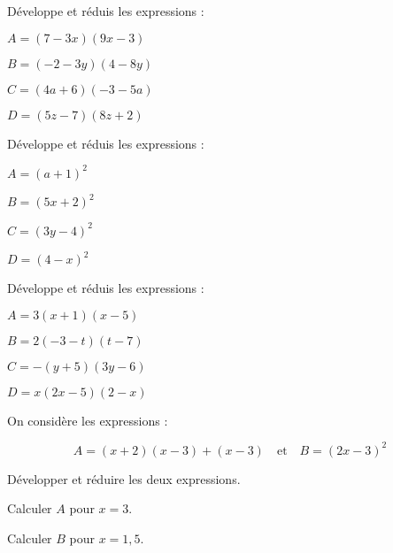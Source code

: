 \begin{exercice}[]
Développe et réduis les expressions :
\begin{colenumerate}{2}
\item $A = (7 -3x)(9x -3)$
\item $B = (-2 -3y)(4 -8y)$
\item $C = (4a + 6)(-3 -5a)$
\item $D = (5z -7)(8z + 2)$
\end{colenumerate}
\end{exercice}

\begin{exercice}[]
Développe et réduis les expressions :
\begin{colenumerate}{2}
\item $A = (a + 1)^2$
\item $B = (5x + 2)^2$
\item $C = (3y -4)^2$
\item $D = (4 -x)^2$
\end{colenumerate}
\end{exercice}

\begin{exercice}[]
Développe et réduis les expressions :
\begin{colenumerate}{2}
\item $A = 3(x + 1)(x -5)$
\item $B = 2(-3 -t)(t -7)$
\item $C = -(y + 5)(3y -6)$
\item $D = x(2x -5)(2 -x)$
\end{colenumerate}
\end{exercice}

\begin{exercice}[]
On considère les expressions :

\[A = (x + 2)(x -3) + (x -3) \quad \text{et} \quad B = (2x -3)^2 \]

\begin{colenumerate}{1} 
\item Développer et réduire les deux expressions.
\item Calculer $A$ pour $x = 3$.
\item Calculer $B$ pour $x = 1,5$.
\end{colenumerate} 
 
\end{exercice}

